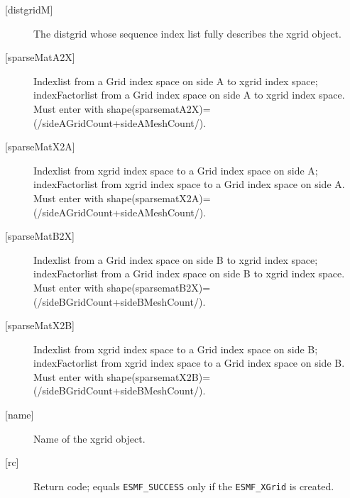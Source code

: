 \begin{description}
       \item [{[distgridM]}]
             The distgrid whose sequence index list fully describes the xgrid object.
       \item [{[sparseMatA2X]}]
             Indexlist from a Grid index space on side A to xgrid index space; 
             indexFactorlist from a Grid index space on side A to xgrid index space. Must enter with shape(sparsematA2X)=(/sideAGridCount+sideAMeshCount/).
       \item [{[sparseMatX2A]}]
             Indexlist from xgrid index space to a Grid index space on side A; 
             indexFactorlist from xgrid index space to a Grid index space on side A. Must enter with shape(sparsematX2A)=(/sideAGridCount+sideAMeshCount/).
       \item [{[sparseMatB2X]}]
             Indexlist from a Grid index space on side B to xgrid index space; 
             indexFactorlist from a Grid index space on side B to xgrid index space. Must enter with shape(sparsematB2X)=(/sideBGridCount+sideBMeshCount/).
       \item [{[sparseMatX2B]}]
             Indexlist from xgrid index space to a Grid index space on side B; 
             indexFactorlist from xgrid index space to a Grid index space on side B. Must enter with shape(sparsematX2B)=(/sideBGridCount+sideBMeshCount/).
       \item [{[name]}]
             Name of the xgrid object.
       \item [{[rc]}]
             Return code; equals {\tt ESMF\_SUCCESS} only if the {\tt ESMF\_XGrid} 
             is created.
       \end{description}
  
\setlength{\parskip}{\oldparskip}
\setlength{\parindent}{\oldparindent}
\setlength{\baselineskip}{\oldbaselineskip}
